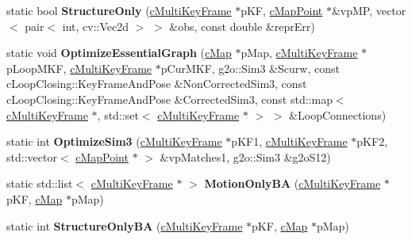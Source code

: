 \begin{DoxyCompactItemize}
\item 
static bool {\bfseries Structure\+Only} (\hyperlink{classMultiColSLAM_1_1cMultiKeyFrame}{c\+Multi\+Key\+Frame} $\ast$p\+KF, \hyperlink{classMultiColSLAM_1_1cMapPoint}{c\+Map\+Point} $\ast$\&vp\+MP, vector$<$ pair$<$ int, cv\+::\+Vec2d $>$ $>$ \&obs, const double \&repr\+Err)\hypertarget{classMultiColSLAM_1_1cOptimizer_a2120e0f9e7985b43d87d799c2881d4ed}{}\label{classMultiColSLAM_1_1cOptimizer_a2120e0f9e7985b43d87d799c2881d4ed}

\item 
static void {\bfseries Optimize\+Essential\+Graph} (\hyperlink{classMultiColSLAM_1_1cMap}{c\+Map} $\ast$p\+Map, \hyperlink{classMultiColSLAM_1_1cMultiKeyFrame}{c\+Multi\+Key\+Frame} $\ast$p\+Loop\+M\+KF, \hyperlink{classMultiColSLAM_1_1cMultiKeyFrame}{c\+Multi\+Key\+Frame} $\ast$p\+Cur\+M\+KF, g2o\+::\+Sim3 \&Scurw, const c\+Loop\+Closing\+::\+Key\+Frame\+And\+Pose \&Non\+Corrected\+Sim3, const c\+Loop\+Closing\+::\+Key\+Frame\+And\+Pose \&Corrected\+Sim3, const std\+::map$<$ \hyperlink{classMultiColSLAM_1_1cMultiKeyFrame}{c\+Multi\+Key\+Frame} $\ast$, std\+::set$<$ \hyperlink{classMultiColSLAM_1_1cMultiKeyFrame}{c\+Multi\+Key\+Frame} $\ast$ $>$ $>$ \&Loop\+Connections)\hypertarget{classMultiColSLAM_1_1cOptimizer_af484d774331b0d6b9ae54806859d74b8}{}\label{classMultiColSLAM_1_1cOptimizer_af484d774331b0d6b9ae54806859d74b8}

\item 
static int {\bfseries Optimize\+Sim3} (\hyperlink{classMultiColSLAM_1_1cMultiKeyFrame}{c\+Multi\+Key\+Frame} $\ast$p\+K\+F1, \hyperlink{classMultiColSLAM_1_1cMultiKeyFrame}{c\+Multi\+Key\+Frame} $\ast$p\+K\+F2, std\+::vector$<$ \hyperlink{classMultiColSLAM_1_1cMapPoint}{c\+Map\+Point} $\ast$ $>$ \&vp\+Matches1, g2o\+::\+Sim3 \&g2o\+S12)\hypertarget{classMultiColSLAM_1_1cOptimizer_abe048cef90fc1d79a0e64f8c46a1b8f1}{}\label{classMultiColSLAM_1_1cOptimizer_abe048cef90fc1d79a0e64f8c46a1b8f1}

\item 
static std\+::list$<$ \hyperlink{classMultiColSLAM_1_1cMultiKeyFrame}{c\+Multi\+Key\+Frame} $\ast$ $>$ {\bfseries Motion\+Only\+BA} (\hyperlink{classMultiColSLAM_1_1cMultiKeyFrame}{c\+Multi\+Key\+Frame} $\ast$p\+KF, \hyperlink{classMultiColSLAM_1_1cMap}{c\+Map} $\ast$p\+Map)\hypertarget{classMultiColSLAM_1_1cOptimizer_ac3e00c4a77b3e687aa2c1b908c18d3c7}{}\label{classMultiColSLAM_1_1cOptimizer_ac3e00c4a77b3e687aa2c1b908c18d3c7}

\item 
static int {\bfseries Structure\+Only\+BA} (\hyperlink{classMultiColSLAM_1_1cMultiKeyFrame}{c\+Multi\+Key\+Frame} $\ast$p\+KF, \hyperlink{classMultiColSLAM_1_1cMap}{c\+Map} $\ast$p\+Map)\hypertarget{classMultiColSLAM_1_1cOptimizer_a37c799d77d9e982f8b6d5658ad4c09f3}{}\label{classMultiColSLAM_1_1cOptimizer_a37c799d77d9e982f8b6d5658ad4c09f3}


\end{DoxyCompactItemize}
